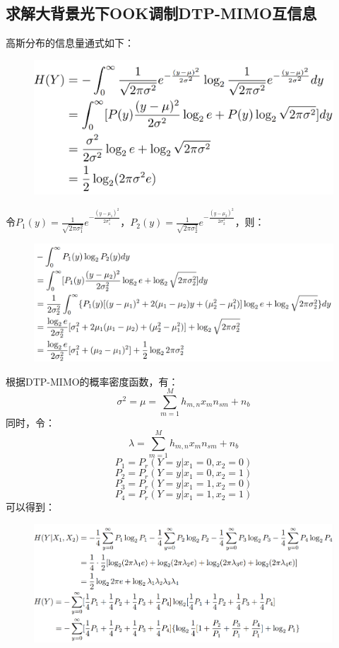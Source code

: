 \documentclass[12pt]{article}
\begin{document}
\subsection{求解大背景光下OOK调制DTP-MIMO互信息}
高斯分布的信息量通式如下：\par
\begin{figure}[htp]
    \centering
    \includegraphics[width=12.5cm]{1.png}
\end{figure}
令$P_1(y)=\frac{1}{\sqrt{2\pi\sigma_1^2}}e^{-\frac{(y-\mu_1)^2}{2\sigma_1^2}}$，$P_2(y)=\frac{1}{\sqrt{2\pi\sigma_2^2}}e^{-\frac{(y-\mu_2)^2}{2\sigma_2^2}}$，则：\par
\begin{figure}[htp]
    \centering
    \includegraphics[width=15.8cm]{2.png}
\end{figure}
根据DTP-MIMO的概率密度函数，有：
$$\sigma^2=\mu=\sum_{m=1}^Mh_{m,n}x_mn_{sm}+n_b$$
同时，令：
$$\lambda=\sum_{m=1}^Mh_{m,n}x_mn_{sm}+n_b$$
$$P_1=P_r(Y=y|x_1=0,x_2=0)$$$$P_2=P_r(Y=y|x_1=0,x_2=1)$$$$P_3=P_r(Y=y|x_1=1,x_2=0)$$$$P_4=P_r(Y=y|x_1=1,x_2=1)$$
\newpage
可以得到：\par
\begin{figure}[htp]
    \centering
    \includegraphics[width=16.9cm]{3.png}
\end{figure}
\end{document}
